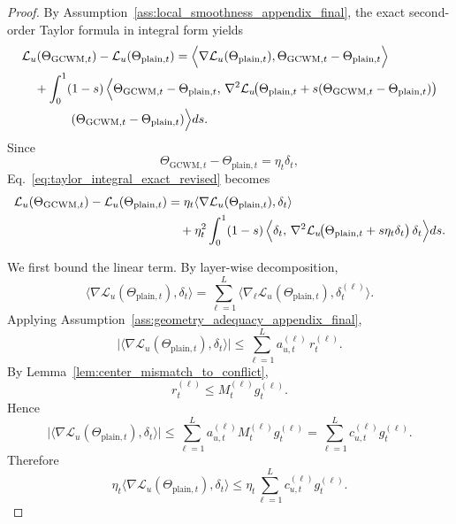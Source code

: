 \documentclass{article}
\begin{document}
\begin{proof}
By Assumption~\ref{ass:local_smoothness_appendix_final}, the exact second-order Taylor formula in integral form yields
\begin{align}
&\mathcal L_u(\Theta_{\mathrm{GCWM},t})
-
\mathcal L_u(\Theta_{\mathrm{plain},t})
=
\Bigl\langle
\nabla \mathcal L_u(\Theta_{\mathrm{plain},t}),
\Theta_{\mathrm{GCWM},t}-\Theta_{\mathrm{plain},t}
\Bigr\rangle
\nonumber\\
&\quad
+
\int_0^1 (1-s)\,
\Bigl\langle
\Theta_{\mathrm{GCWM},t}-\Theta_{\mathrm{plain},t},\,
\nabla^2\mathcal L_u\!\bigl(
\Theta_{\mathrm{plain},t}
+s(\Theta_{\mathrm{GCWM},t}-\Theta_{\mathrm{plain},t})
\bigr)
\nonumber\\
&\qquad\qquad
(\Theta_{\mathrm{GCWM},t}-\Theta_{\mathrm{plain},t})
\Bigr\rangle ds.
\label{eq:taylor_integral_exact_revised}
\end{align}
Since
\[
\Theta_{\mathrm{GCWM},t}-\Theta_{\mathrm{plain},t}
=
\eta_t \delta_t,
\]
Eq.~\eqref{eq:taylor_integral_exact_revised} becomes
\begin{align}
\mathcal L_u(\Theta_{\mathrm{GCWM},t})
-
\mathcal L_u(\Theta_{\mathrm{plain},t})
&=
\eta_t
\langle
\nabla \mathcal L_u(\Theta_{\mathrm{plain},t}),
\delta_t
\rangle
\nonumber\\
&\quad
+
\eta_t^2
\int_0^1 (1-s)\,
\Bigl\langle
\delta_t,\,
\nabla^2\mathcal L_u\!\bigl(\Theta_{\mathrm{plain},t}+s\eta_t\delta_t\bigr)\,
\delta_t
\Bigr\rangle ds.
\label{eq:taylor_substituted_revised}
\end{align}

We first bound the linear term. By layer-wise decomposition,
\begin{equation}
\langle
\nabla \mathcal L_u(\Theta_{\mathrm{plain},t}),
\delta_t
\rangle
=
\sum_{\ell=1}^L
\langle
\nabla_{\ell}\mathcal L_u(\Theta_{\mathrm{plain},t}),
\delta_t^{(\ell)}
\rangle.
\label{eq:linear_layer_decomp_revised}
\end{equation}
Applying Assumption~\ref{ass:geometry_adequacy_appendix_final},
\begin{equation}
\bigl|
\langle
\nabla \mathcal L_u(\Theta_{\mathrm{plain},t}),
\delta_t
\rangle
\bigr|
\le
\sum_{\ell=1}^L
a_{u,t}^{(\ell)}\, r_t^{(\ell)}.
\label{eq:linear_bound_via_r_revised}
\end{equation}
By Lemma~\ref{lem:center_mismatch_to_conflict},
\[
r_t^{(\ell)}
\le
M_t^{(\ell)} g_t^{(\ell)}.
\]
Hence
\begin{equation}
\bigl|
\langle
\nabla \mathcal L_u(\Theta_{\mathrm{plain},t}),
\delta_t
\rangle
\bigr|
\le
\sum_{\ell=1}^L
a_{u,t}^{(\ell)}M_t^{(\ell)} g_t^{(\ell)}
=
\sum_{\ell=1}^L
c_{u,t}^{(\ell)} g_t^{(\ell)}.
\label{eq:linear_bound_via_g_revised}
\end{equation}
Therefore
\begin{equation}
\eta_t
\langle
\nabla \mathcal L_u(\Theta_{\mathrm{plain},t}),
\delta_t
\rangle
\le
\eta_t
\sum_{\ell=1}^L
c_{u,t}^{(\ell)} g_t^{(\ell)}.
\label{eq:linear_term_final_revised}
\end{equation}


\end{proof}
\end{document}
